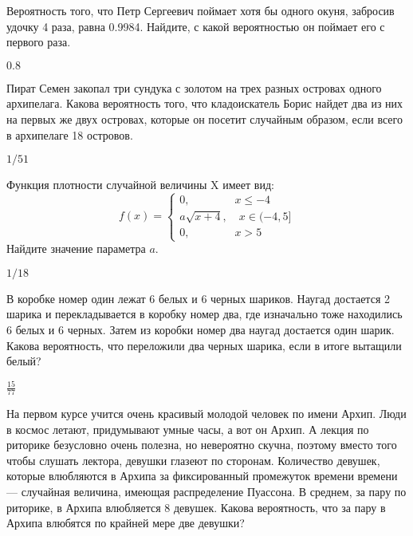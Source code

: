 \documentclass[12pt, addpoints, answers]{exam} %
\begin{document}
\begin{questions}
\question Вероятность того, что Петр Сергеевич поймает хотя бы одного окуня, забросив удочку 4 раза, равна 0.9984. Найдите, с какой вероятностью он поймает его с первого раза.

\begin{solution}
 $0.8$
\end{solution}

\question Пират Семен закопал три сундука с золотом на трех разных островах одного архипелага. Какова вероятность того, что кладоискатель Борис найдет два из них на первых же двух островах, которые он посетит случайным образом, если всего в архипелаге 18 островов.

\begin{solution}
 $1/51$
\end{solution}

\question Функция плотности случайной величины X имеет вид:
\[
f(x)=
\begin{cases}
0,\quad \quad \quad \quad  x \leqslant -4\\
a\sqrt{x+4},\quad x \in (-4,5]\\
0,\quad \quad \quad \quad x>5
\end{cases}
\]
Найдите значение параметра $a$.

\begin{solution}
 $ 1/18$
\end{solution}


\question В коробке номер один лежат 6 белых и 6 черных шариков. Наугад достается 2 шарика и перекладывается в коробку номер два, где изначально тоже находились 6 белых и 6 черных. Затем из коробки номер два наугад достается один шарик. Какова вероятность, что переложили два черных шарика, если в итоге вытащили белый?

\begin{solution}
 $\frac{15}{77}$
\end{solution}



\question На первом курсе учится очень красивый молодой человек по имени Архип. Люди в космос летают, придумывают умные часы, а вот он Архип. А лекция по риторике безусловно очень полезна, но невероятно скучна, поэтому вместо того чтобы слушать лектора, девушки глазеют по сторонам. Количество девушек, которые влюбляются в Архипа за фиксированный промежуток времени времени --- случайная величина, имеющая распределение Пуассона. В среднем, за пару по риторике, в Архипа влюбляется 8 девушек. Какова вероятность, что за пару в Архипа влюбятся по крайней мере две девушки?


\end{questions}
\end{document}
